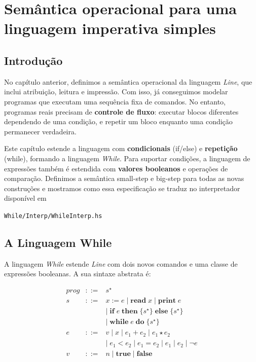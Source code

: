 \chapter{Semântica operacional para uma linguagem imperativa simples}

\section{Introdução}

No capítulo anterior, definimos a semântica operacional da linguagem
\emph{Line}, que inclui atribuição, leitura e impressão. Com isso, já
conseguimos modelar programas que executam uma sequência fixa de
comandos. No entanto, programas reais precisam de \textbf{controle de
fluxo}: executar blocos diferentes dependendo de uma condição, e
repetir um bloco enquanto uma condição permanecer verdadeira.

Este capítulo estende a linguagem com \textbf{condicionais}
(if/else) e \textbf{repetição}
(while), formando a linguagem \emph{While}.
Para suportar condições, a linguagem de expressões também é estendida
com \textbf{valores booleanos} e operações de comparação. Definimos a
semântica small-step e big-step para todas as novas construções e
mostramos como essa especificação se traduz no interpretador
disponível em
\begin{flushleft}
  \verb|While/Interp/WhileInterp.hs|
\end{flushleft}

\section{A Linguagem While}

A linguagem \emph{While} estende \emph{Line} com dois novos comandos
e uma classe de expressões booleanas. A sua sintaxe abstrata é:

\[
  \begin{array}{lcl}
    \mathit{prog} & ::= & s^\star\\
    s & ::= & x \mathbin{:=} e
    \mid \mathbf{read}\; x
    \mid \mathbf{print}\; e \\
    &    & \mid\; \mathbf{if}\; e\; \mathbf{then}\; \{s^\star\}\;
    \mathbf{else}\; \{s^\star\} \\
    &    & \mid\; \mathbf{while}\; e\; \mathbf{do}\; \{s^\star\} \\
    e & ::= & v \mid x
    \mid e_1 + e_2 \mid e_1 \star e_2 \\
    &    & \mid\; e_1 < e_2 \mid e_1 = e_2 \mid e_1 \mathbin{|} e_2
    \mid \neg e \\
    v & ::= & n \mid \mathbf{true} \mid \mathbf{false}
  \end{array}
\]

